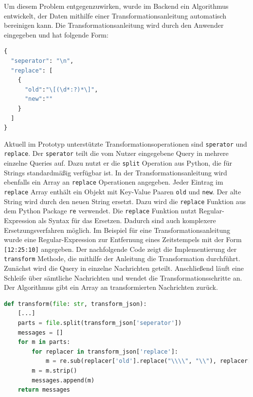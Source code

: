 Um diesem Problem entgegenzuwirken, wurde im Backend ein Algorithmus entwickelt, der Daten mithilfe einer Transformationsanleitung automatisch bereinigen kann. Die Transformationsanleitung wird durch den Anwender eingegeben und hat folgende Form:

\begin{lstlisting}[language=Python, caption={Beispiel einer Transformationsanleitung}]
{
  "seperator": "\n",
  "replace": [
    {
      "old":"\[(\d*:?)*\]",
      "new":""
    }
  ]
}
\end{lstlisting}

Aktuell im Prototyp unterstützte Transformationsoperationen sind \texttt{sperator} und \texttt{replace}. Der \texttt{sperator} teilt die vom Nutzer eingegebene Query in mehrere einzelne Queries auf. Dazu nutzt er die \texttt{split} Operation aus Python, die für Strings standardmäßig verfügbar ist. In der Transformationsanleitung wird ebenfalls ein Array an \texttt{replace} Operationen angegeben. Jeder Eintrag im \texttt{replace} Array enthält ein Objekt mit Key-Value Paaren \texttt{old} und \texttt{new}. Der alte String wird durch den neuen String ersetzt. Dazu wird die \texttt{replace} Funktion aus dem Python Package \texttt{re} verwendet. Die \texttt{replace} Funktion nutzt Regular-Expression als Syntax für das Ersetzen. Dadurch sind auch komplexere Ersetzungsverfahren möglich. Im Beispiel für eine Transformationsanleitung wurde eine Regular-Expression zur Entfernung eines Zeitstempels mit der Form \texttt{[12:25:10]} angegeben. Der nachfolgende Code zeigt die Implementierung der \texttt{transform} Methode, die mithilfe der Anleitung die Transformation durchführt. Zunächst wird die Query in einzelne Nachrichten geteilt. Anschließend läuft eine Schleife über sämtliche Nachrichten und wendet die Transformationsschritte an. Der Algorithmus gibt ein Array an transformierten Nachrichten zurück.

\begin{lstlisting}[language=Python, caption={Transformationsalgorithmus}]
def transform(file: str, transform_json):
    [...]
    parts = file.split(transform_json['seperator'])
    messages = []
    for m in parts:
        for replacer in transform_json['replace']:
            m = re.sub(replacer['old'].replace("\\\\", "\\"), replacer['new'], m)
        m = m.strip()
        messages.append(m)
    return messages

\end{lstlisting}

